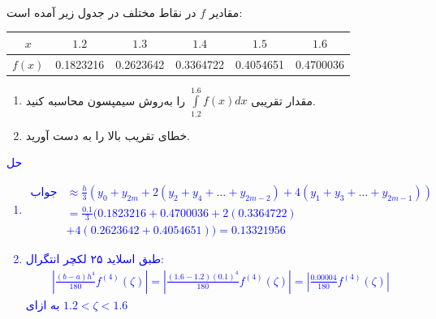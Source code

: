 \\
مقادیر
$f$
در نقاط مختلف در جدول زیر آمده است:

\begin{latin}
\begin{table}[H]
  \begin{center}
    \begin{tabular}{c|c c c c c}
      \textbf{$x$} & $1.2$ & $1.3$ & $1.4$ & $1.5$ & $1.6$ \\
      \hline
      \textbf{$f(x)$} & 0.1823216 & 0.2623642 & 0.3364722 & 0.4054651 & 0.4700036 \\
    \end{tabular}
  \end{center}
\end{table}
\end{latin}

\begin{enumerate}
	\item
    مقدار تقریبی
    $\int\limits^{1.6}_{1.2}f(x)dx$
    را به‌روش سیمپسون محاسبه کنید.
    
    \item
    خطای تقریب بالا را به دست آورید.
\end{enumerate}
\textcolor{blue}{حل
\\
\begin{enumerate}
    \item
    \begin{align*}
        \text{جواب} &\approx \frac{h}{3} (y_0 + y_{2m} + 2(y_2 + y_4 + \dots + y_{2m - 2}) + 4(y_1 + y_3 + \dots + y_{2m - 1})) \\
        &= \frac{0.1}{3} (0.1823216 + 0.4700036 + 2 (0.3364722) \\
        &+ 4(0.2623642+0.4054651)) = 0.13321956 
    \end{align*}
    \item 
    طبق اسلاید ۲۵ لکچر انتگرال:
    \begin{align*}
        |\frac{(b-a)h^4}{180} f^{(4)} (\zeta)| = |\frac{(1.6 - 1.2)(0.1)^4}{180} f^{(4)}(\zeta)| = |\frac{0.00004}{180} f^{(4)}(\zeta)|
    \end{align*}
    به ازای
    $1.2 < \zeta < 1.6$
\end{enumerate}
}
